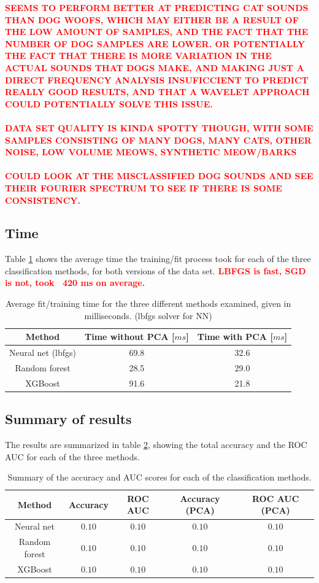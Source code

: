 \documentclass[a4paper]{article}
\newcommand\red[1]{\textcolor{red}{\textbf{#1}}}
\begin{document}
\red{SEEMS TO PERFORM BETTER AT PREDICTING CAT SOUNDS THAN DOG WOOFS, WHICH MAY EITHER BE A RESULT OF THE LOW AMOUNT OF SAMPLES, AND THE FACT THAT THE NUMBER OF DOG SAMPLES ARE LOWER. OR POTENTIALLY THE FACT THAT THERE IS MORE VARIATION IN THE ACTUAL SOUNDS THAT DOGS MAKE, AND MAKING JUST A DIRECT FREQUENCY ANALYSIS INSUFICCIENT TO PREDICT REALLY GOOD RESULTS, AND THAT A WAVELET APPROACH COULD POTENTIALLY SOLVE THIS ISSUE.}
\\\\
\red{DATA SET QUALITY IS KINDA SPOTTY THOUGH, WITH SOME SAMPLES CONSISTING OF MANY DOGS, MANY CATS, OTHER NOISE, LOW VOLUME MEOWS, SYNTHETIC MEOW/BARKS}
\\\\
\red{COULD LOOK AT THE MISCLASSIFIED DOG SOUNDS AND SEE THEIR FOURIER SPECTRUM TO SEE IF THERE IS SOME CONSISTENCY.}
\subsection{Time}
Table \ref{tab:timing} shows the average time the training/fit process took for each of the three classification methods, for both versions of the data set. \red{LBFGS is fast, SGD is not, took ~420 ms on average.} 
\begin{table}[H]
  \centering
  \caption{Average fit/training time for the three different methods examined, given in milliseconds. (lbfgs solver for NN)}
  \label{tab:timing}
  \begin{tabular}{c|c|c}
    \hline\hline
    Method & Time without PCA [$ms$] & Time with PCA [$ms$] \\\hline
    Neural net (lbfgs) & 69.8 & 32.6 \\
    Random forest & 28.5 & 29.0 \\
    XGBoost & 91.6 & 21.8
    \end{tabular}
\end{table}

\subsection{Summary of results}
The results are summarized in table \ref{tab:summary}, showing the total accuracy and the ROC AUC for each of the three methods.
\begin{table}[H]
  \centering
  \caption{Summary of the accuracy and AUC scores for each of the classification methods.}
  \label{tab:summary}
  \begin{tabular}{c|c|c||c|c}
    \hline\hline
    Method & Accuracy & ROC AUC & Accuracy (PCA) & ROC AUC (PCA) \\\hline
    Neural net & $0.10$ & $0.10$ & $0.10$ & $0.10$ \\
    Random forest & $0.10$ & $0.10$ & $0.10$ & $0.10$ \\
    XGBoost & $0.10$ & $0.10$ & $0.10$ & $0.10$
    \end{tabular}
\end{table}
\end{document}
